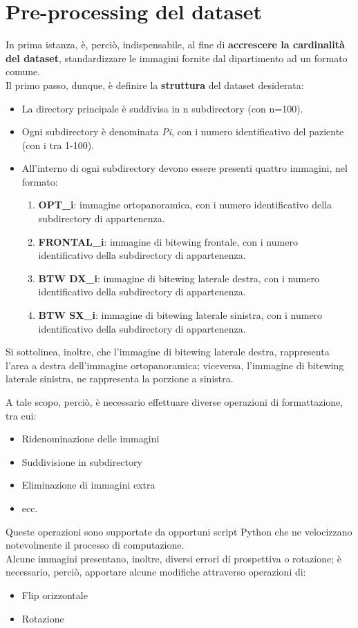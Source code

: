 \documentclass[12pt,a4paper,openright,twoside]{book}
\begin{document}
\section{Pre-processing del dataset}
In prima istanza, è, perciò, indispensabile, al fine di \textbf{accrescere la cardinalità del dataset}, standardizzare le immagini fornite dal dipartimento ad un formato comune.\\
Il primo passo, dunque, è definire la \textbf{struttura} del dataset desiderata:
\begin{itemize}
\item La directory principale è suddivisa in n subdirectory (con n=100).
\item Ogni subdirectory è denominata {\itshape Pi}, con i numero identificativo del paziente (con i tra 1-100).
\item All'interno di ogni subdirectory devono essere presenti quattro immagini, nel formato:
\begin{enumerate}
\item \textbf{OPT\_i}: immagine ortopanoramica, con i numero identificativo della subdirectory di appartenenza. 
\item \textbf{FRONTAL\_i}: immagine di bitewing frontale, con i numero identificativo della subdirectory di appartenenza. 
\item \textbf{BTW DX\_i}: immagine di bitewing laterale destra, con i numero identificativo della subdirectory di appartenenza. 
\item \textbf{BTW SX\_i}: immagine di bitewing laterale sinistra, con i numero identificativo della subdirectory di appartenenza. 
\end{enumerate}
\end{itemize}
Si sottolinea, inoltre, che l'immagine di bitewing laterale destra, rappresenta l'area a destra dell'immagine ortopanoramica; viceversa, l'immagine di bitewing laterale sinistra, ne rappresenta la porzione a sinistra.

A tale scopo, perciò, è necessario effettuare diverse operazioni di formattazione, tra cui:
\begin{itemize}
\item Ridenominazione delle immagini
\item Suddivisione in subdirectory
\item Eliminazione di immagini extra
\item ecc.
\end{itemize}
Queste operazioni sono supportate da opportuni script Python che ne velocizzano notevolmente il processo di computazione.\\
Alcune immagini presentano, inoltre, diversi errori di prospettiva o rotazione; è necessario, perciò, apportare alcune modifiche attraverso operazioni di:
\begin{itemize}
\item Flip orizzontale
\item Rotazione
\end{itemize}
\end{document}
